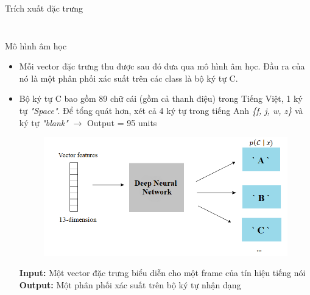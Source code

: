 \documentclass[10pt,a4paper,openany]{beamer}
\begin{document}
\begin{frame}{Trích xuất đặc trưng}
\begin{columns}
\begin{column}{0.5\textwidth}
\begin{figure}[htbp]
					\label{fig_frame_extract}
				\end{figure}
			\end{column}
		\end{columns}
	\end{frame}
	
	\begin{frame}{Mô hình âm học}  \pause
		\begin{itemize}
			\item Mỗi vector đặc trưng thu được sau đó đưa qua mô hình âm học. Đầu ra của nó là một phân phối xác suất trên các class là bộ ký tự C.  \pause
			\item Bộ ký tự C bao gồm 89 chữ cái (gồm cả thanh điệu) trong Tiếng Việt, 1 ký tự \emph{"Space"}. Để tổng quát hơn, xét cả 4 ký tự trong tiếng Anh \emph{\{f, j, w, z\}} và ký tự \emph{"blank"} $\rightarrow$ Output = 95 units  \pause
			\begin{figure}[htbp]
				\centerline{\includegraphics[scale=0.4]{charts/features2dnn.png}}
				\label{fig_feature2dnn}
			\end{figure}  \pause
			\textbf{Input:} Một vector đặc trưng biểu diễn cho một frame của tín hiệu tiếng nói \\  \pause
			\textbf{Output:} Một phân phối xác suất trên bộ ký tự nhận dạng 
		\end{itemize}
	\end{frame}
	
	
\end{document}
